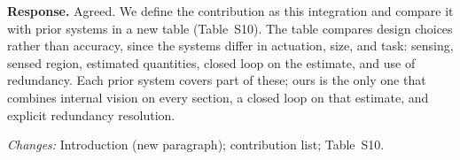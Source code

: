 \textbf{Response.} Agreed. We define the contribution as this integration and compare it with prior systems in a new table (Table~S10). The table compares design choices rather than accuracy, since the systems differ in actuation, size, and task: sensing, sensed region, estimated quantities, closed loop on the estimate, and use of redundancy. Each prior system covers part of these; ours is the only one that combines internal vision on every section, a closed loop on that estimate, and explicit redundancy resolution.

\textit{Changes:} Introduction (new paragraph); contribution list; Table~S10.

